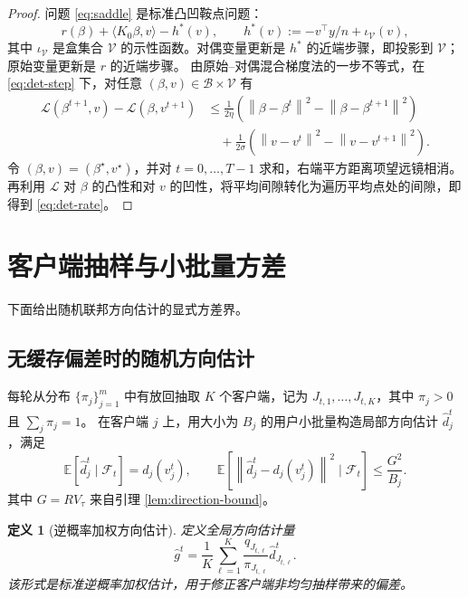 \documentclass[UTF8,a4paper,11pt]{ctexart}
\newtheorem{definition}{定义}
\newcommand{\E}{\mathbb{E}}
\newcommand{\V}{\mathcal{V}}
\newcommand{\B}{\mathcal{B}}
\newcommand{\F}{\mathcal{F}}
\newcommand{\norm}[1]{\left\|#1\right\|}
\begin{document}
\begin{proof}
问题 \eqref{eq:saddle} 是标准凸凹鞍点问题：
\[
    r(\beta)+\langle K_0\beta,v\rangle-h^\ast(v),
    \qquad
    h^\ast(v):=-v^\top y/n+\iota_{\V}(v),
\]
其中 $\iota_\V$ 是盒集合 $\V$ 的示性函数。对偶变量更新是 $h^\ast$ 的近端步骤，即投影到 $\V$；原始变量更新是 $r$ 的近端步骤。
由原始--对偶混合梯度法的一步不等式，在 \eqref{eq:det-step} 下，对任意 $(\beta,v)\in\B\times\V$ 有
\begin{align}
    \mathcal{L}(\beta^{t+1},v)
    -
    \mathcal{L}(\beta,v^{t+1})
    &\le
    \frac{1}{2\eta}
    \left(
        \norm{\beta-\beta^t}^2
        -
        \norm{\beta-\beta^{t+1}}^2
    \right)
    \nonumber\\
    &\quad+
    \frac{1}{2\sigma}
    \left(
        \norm{v-v^t}^2
        -
        \norm{v-v^{t+1}}^2
    \right).
    \label{eq:pdhg-one-step}
\end{align}
令 $(\beta,v)=(\beta^\star,v^\star)$，并对 $t=0,\ldots,T-1$ 求和，右端平方距离项望远镜相消。再利用 $\mathcal{L}$ 对 $\beta$ 的凸性和对 $v$ 的凹性，将平均间隙转化为遍历平均点处的间隙，即得到 \eqref{eq:det-rate}。
\end{proof}

\section{客户端抽样与小批量方差}

下面给出随机联邦方向估计的显式方差界。

\subsection{无缓存偏差时的随机方向估计}

每轮从分布 $\{\pi_j\}_{j=1}^m$ 中有放回抽取 $K$ 个客户端，记为
$J_{t,1},\ldots,J_{t,K}$，其中 $\pi_j>0$ 且 $\sum_j\pi_j=1$。
在客户端 $j$ 上，用大小为 $B_j$ 的用户小批量构造局部方向估计 $\widehat d_j^t$，满足
\begin{equation}
    \E[\widehat d_j^t\mid\F_t]=d_j(v_j^t),
    \qquad
    \E\left[
    \norm{\widehat d_j^t-d_j(v_j^t)}^2
    \mid\F_t
    \right]
    \le
    \frac{G^2}{B_j}.
    \label{eq:local-batch-var}
\end{equation}
其中 $G=RV_\tau$ 来自引理 \ref{lem:direction-bound}。

\begin{definition}[逆概率加权方向估计]
定义全局方向估计量
\begin{equation}
    \widehat g^t
    =
    \frac{1}{K}
    \sum_{\ell=1}^K
    \frac{q_{J_{t,\ell}}}{\pi_{J_{t,\ell}}}
    \widehat d_{J_{t,\ell}}^t.
    \label{eq:ht-estimator}
\end{equation}
该形式是标准逆概率加权估计，用于修正客户端非均匀抽样带来的偏差。
\end{definition}
\end{document}
